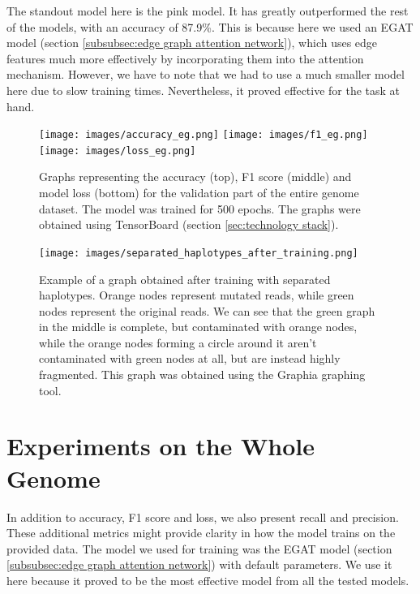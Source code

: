 \documentclass[times, utf8, diplomski, english]{fer_eng}
\begin{document}
The standout model here is the pink model. It has greatly outperformed the rest of the models, with an accuracy of 87.9\%. This is because here we used an EGAT model (section \ref{subsubsec:edge graph attention network}), which uses edge features much more effectively by incorporating them into the attention mechanism. However, we have to note that we had to use a much smaller model here due to slow training times. Nevertheless, it proved effective for the task at hand.

\begin{figure}
	\centering
	\texttt{[image: images/accuracy\_eg.png]}
	\texttt{[image: images/f1\_eg.png]}
	\texttt{[image: images/loss\_eg.png]}
	\caption[Accuracy,f1 score and loss graph]{Graphs representing the accuracy (top), F1 score (middle) and model loss (bottom) for the validation part of the entire genome dataset. The model was trained for 500 epochs. The graphs were obtained using TensorBoard (section \ref{sec:technology stack}).}
	\label{fig:accuracy, f1 score and loss}
\end{figure}

\begin{figure}
	\centering
	\texttt{[image: images/separated\_haplotypes\_after\_training.png]}
	\caption[Separated graph after training]{Example of a graph obtained after training with separated haplotypes. Orange nodes represent mutated reads, while green nodes represent the original reads. We can see that the green graph in the middle is complete, but contaminated with orange nodes, while the orange nodes forming a circle around it aren't contaminated with green nodes at all, but are instead highly fragmented. This graph was obtained using the Graphia\footnotemark{} graphing tool.}
	\label{fig:separated graph after training}
\end{figure}

\section{Experiments on the Whole Genome}
\label{sec:experiments on the whole genome}

In addition to accuracy, F1 score and loss, we also present recall and precision. These additional metrics might provide clarity in how the model trains on the provided data. The model we used for training was the EGAT model (section \ref{subsubsec:edge graph attention network}) with default parameters. We use it here because it proved to be the most effective model from all the tested models.
\end{document}
